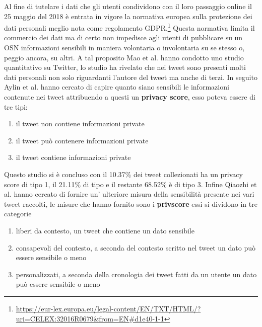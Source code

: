 Al fine di tutelare i dati che gli utenti condividono con il loro passaggio online il 25 maggio del 2018 è entrata in vigore la normativa europea sulla protezione dei dati personali meglio nota come regolamento GDPR.\footnote{\url{https://eur-lex.europa.eu/legal-content/EN/TXT/HTML/?uri=CELEX:32016R0679&from=EN\#d1e40-1-1}}
Questa normativa limita il commercio dei dati ma di certo non impedisce agli utenti di pubblicare su un OSN informazioni sensibili in maniera volontaria o involontaria su se stesso o, peggio ancora, su altri. A tal proposito Mao et al. \cite{looseTweets} hanno condotto uno studio quantitativo su Twitter, lo studio ha rivelato che nei tweet sono presenti molti dati personali non solo riguardanti l'autore del tweet ma anche di terzi. In seguito Aylin et al.\cite{privacyDetective} hanno cercato di capire quanto siano sensibili le informazioni contenute nei tweet attribuendo a questi un \textbf{privacy score}, esso poteva essere di tre tipi:
\begin{enumerate}
    \item il tweet non contiene informazioni private
    \item il tweet può contenere informazioni private
    \item il tweet contiene informazioni private
\end{enumerate}
Questo studio si è concluso con il 10.37\% dei tweet collezionati ha un privacy score di tipo 1, il 21.11\% di tipo e il restante 68.52\% è di tipo 3.
Infine Qiaozhi et al. \cite{dontTweetThis} hanno cercato di fornire un' ulteriore misura della sensibilità presente nei vari tweet raccolti, le misure che hanno fornito sono i \textbf{privscore} essi si dividono in tre categorie
\begin{enumerate}
    \item liberi da contesto, un tweet che contiene un dato sensibile
    \item consapevoli del contesto, a seconda del contesto scritto nel tweet un dato può essere sensibile o meno
    \item personalizzati, a seconda della cronologia dei tweet fatti da un utente un dato può essere sensibile o meno
\end{enumerate}